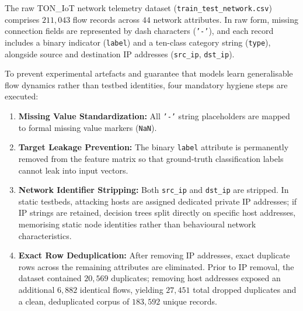 The raw TON\_IoT network telemetry dataset (\texttt{train\_test\_network.csv}) comprises $211{,}043$ flow records across $44$ network attributes. In raw form, missing connection fields are represented by dash characters (\texttt{'-'}), and each record includes a binary indicator (\texttt{label}) and a ten-class category string (\texttt{type}), alongside source and destination IP addresses (\texttt{src\_ip}, \texttt{dst\_ip}).

To prevent experimental artefacts and guarantee that models learn generalisable flow dynamics rather than testbed identities, four mandatory hygiene steps are executed:
\begin{enumerate}
    \item \textbf{Missing Value Standardization:} All \texttt{'-'} string placeholders are mapped to formal missing value markers (\texttt{NaN}).
    \item \textbf{Target Leakage Prevention:} The binary \texttt{label} attribute is permanently removed from the feature matrix so that ground-truth classification labels cannot leak into input vectors.
    \item \textbf{Network Identifier Stripping:} Both \texttt{src\_ip} and \texttt{dst\_ip} are stripped. In static testbeds, attacking hosts are assigned dedicated private IP addresses; if IP strings are retained, decision trees split directly on specific host addresses, memorising static node identities rather than behavioural network characteristics.
    \item \textbf{Exact Row Deduplication:} After removing IP addresses, exact duplicate rows across the remaining attributes are eliminated. Prior to IP removal, the dataset contained $20{,}569$ duplicates; removing host addresses exposed an additional $6{,}882$ identical flows, yielding $27{,}451$ total dropped duplicates and a clean, deduplicated corpus of $183{,}592$ unique records.
\end{enumerate}

